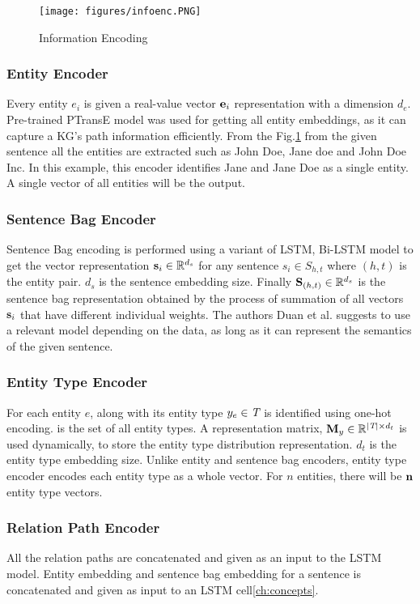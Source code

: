 \begin{figure}[h!]
	\centering
	\texttt{[image: figures/infoenc.PNG]}
	\caption{Information Encoding}
	\label{fig:infenc}
\end{figure}

\subsubsection{Entity Encoder} 
Every entity $e_i$ is given a real-value vector $\textbf{e}_i$ representation with a dimension $d_e$. Pre-trained PTransE model was used for getting all entity embeddings, as it can capture a KG's path information efficiently. From the Fig.\ref{fig:infenc} from the given sentence all the entities are extracted such as John Doe, Jane doe and John Doe Inc. In this example, this encoder identifies Jane and Jane Doe as a single entity. A single vector of all entities will be the output.

\subsubsection{Sentence Bag Encoder}
Sentence Bag encoding is performed using a variant of LSTM, Bi-LSTM model to get the vector representation $\textbf{s}_i \in \mathbb{R}^{d_s}$ for any sentence $s_i \in S_{h,t}$ where $\left(h,t\right)$ is the entity pair. $d_s$ is the sentence embedding size. Finally $\textbf{S}_{\left(h,t\right)} \in \mathbb{R}^{d_s}$ is the sentence bag representation obtained by the process of summation of all vectors $\textbf{s}_i$ that have different individual weights. The authors Duan et al.\cite{duan2019hybrid} suggests to use a relevant model depending on the data, as long as it can represent the semantics of the given sentence. 

\subsubsection{Entity Type Encoder}
For each entity $e$, along with its entity type $y_e \in \textit{T}$ is identified using one-hot encoding.  is the set of all entity types. A representation matrix, $\textbf{M}_y \in \mathbb{R}^{|\textit{T}| \times d_t}$ is used dynamically, to store the entity type distribution representation. $d_t$ is the entity type embedding size. Unlike entity and sentence bag encoders, entity type encoder encodes each entity type as a whole vector. For $n$ entities, there will be $\textbf{n}$ entity type vectors.

\subsubsection{Relation Path Encoder}
All the relation paths are concatenated and given as an input to the LSTM model. Entity embedding and sentence bag embedding for a sentence is concatenated and given as input to an LSTM cell\ref{ch:concepts}. 

